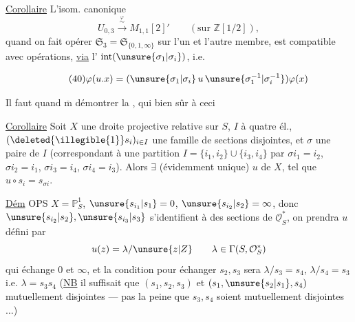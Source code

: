 \uline{Corollaire} L'isom. canonique
\[
U_{0,3}\xrightarrow{\overset{\varphi}{\sim}}M_{1,1}[2]'
\qquad (\text{sur }\mathbb Z[1/2]),
\]
quand on fait opérer $\mathfrak{S}_3=\mathfrak{S}_{\{0,1,\infty\}}$ sur
l'un et l'autre membre, est compatible
avec  opérations, \uline{via} l' $\operatorname{int}(\unsure{\sigma_1|\sigma_i})$, i.e.


\[
\tag{40}
\varphi(u.x)=(\unsure{\sigma_1|\sigma_i}\,u\,\unsure{\sigma_1^{-1}|\sigma_i^{-1}})\varphi(x)
\]

Il faut quand $\overline{\mathrm m}$ démontrer la ,
qui  bien sûr à ceci

\uline{Corollaire} Soit $X$ une droite projective
relative sur  $S$, $I$  à quatre él.,
$(\deleted{\illegible{1}}s_i)_{i\in I}$ une famille de sections 
disjointes, et $\sigma$ une  paire de
$I$ (correspondant à une partition $I=\{i_1,i_2\}\cup\{i_3,i_4\}$
par $\sigma i_1=i_2$, $\sigma i_2=i_1$, $\sigma i_3=i_4$, $\sigma i_4=i_3$). Alors $\exists$
 (évidemment unique) $u$ de $X$,
tel que $u\circ s_i=s_{\sigma i}$.

\uline{Dém} OPS $X=\mathbb P^1_S$, $\unsure{s_{i_1}|s_1}=0$, $\unsure{s_{i_2}|s_2}=\infty$, donc
$\unsure{s_{i_2}|s_2},\unsure{s_{i_3}|s_3}$ s'identifient à des sections de
$\underline{\mathcal O}_S^*$, on prendra  $u$ défini par
\[
u(z)=\lambda/\unsure{z|Z}\qquad\lambda\in\Gamma(S,\mathcal O_S^*)
\]
qui échange $0$ et $\infty$, et la condition
pour échanger $s_2,s_3$ sera $\lambda/s_3=s_4$, $\lambda/s_4=s_3$
i.e. $\lambda=s_3s_4$ (\uline{NB} il suffisait que
$(s_1,s_2,s_3)$ et $(s_1,\unsure{s_2|s_1},s_4)$  mutuellement disjointes ---
pas la peine que $s_3,s_4$ soient mutuellement
disjointes $\ldots$)


